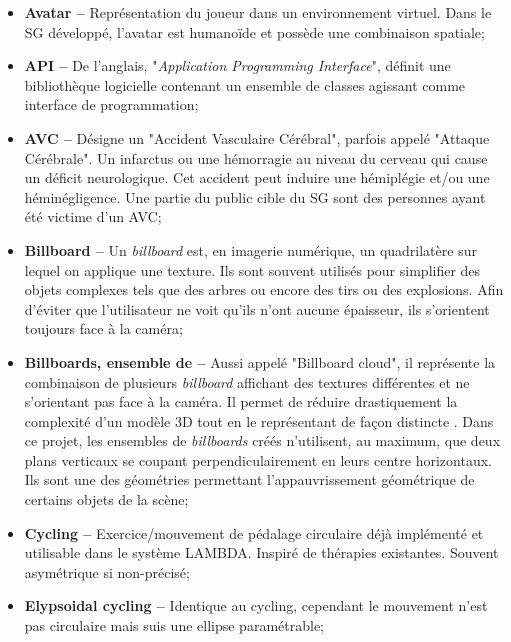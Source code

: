 \begin{itemize}
	\item \textbf{Avatar --} Représentation du joueur dans un environnement virtuel. Dans le SG développé, l'avatar est humanoïde et possède une combinaison spatiale;
	
	\item \textbf{API --} De l'anglais, "\textit{Application Programming Interface}", définit une bibliothèque logicielle contenant un ensemble de classes agissant comme interface de programmation;
	
	\item \textbf{AVC --} Désigne un "Accident Vasculaire Cérébral", parfois appelé "Attaque Cérébrale". Un infarctus ou une hémorragie au niveau du cerveau qui cause un déficit neurologique. Cet accident peut induire une hémiplégie et/ou une héminégligence. Une partie du public cible du SG sont des personnes ayant été victime d'un AVC;
	
	\item \textbf{Billboard --} Un \textit{billboard} est, en imagerie numérique, un quadrilatère sur lequel on applique une texture. Ils sont souvent utilisés pour simplifier des objets complexes tels que des arbres ou encore des tirs ou des explosions. Afin d'éviter que l'utilisateur ne voit qu'ils n'ont aucune épaisseur, ils s'orientent toujours face à la caméra;
	
	\item \textbf{Billboards, ensemble de --} Aussi appelé "Billboard cloud", il représente la combinaison de plusieurs \textit{billboard} affichant des textures différentes et ne s'orientant pas face à la caméra. Il permet de réduire drastiquement la complexité d'un modèle 3D tout en le représentant de façon distincte \cite{Behrendt_BillboardCloud, Decoret_BillboardCloud, Decoret_BillboardCloudExtrem}. Dans ce projet, les ensembles de \textit{billboards} créés n'utilisent, au maximum, que deux plans verticaux se coupant perpendiculairement en leurs centre horizontaux. Ils sont une des géométries permettant l'appauvrissement géométrique de certains objets de la scène;
	
	\item \textbf{Cycling --} Exercice/mouvement de pédalage circulaire déjà implémenté et utilisable dans le système LAMBDA. Inspiré de thérapies existantes. Souvent asymétrique si non-précisé;
	
	\item \textbf{Elypsoidal cycling --} Identique au cycling, cependant le mouvement n'est pas circulaire mais suis une ellipse paramétrable;
	

\end{itemize}
